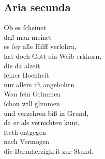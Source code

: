 \documentclass{ees}
\newenvironment{lyrics}[1]{%
  \subsection{#1}\nopagebreak%
  \begin{lyricslist}%
  \let\voice\item%
}{%
  \end{lyricslist}%
}
\begin{document}
\begin{lyrics}{Aria secunda}
  \voice[Barmh.]
  Ob es ſcheinet\\
  daß man meinet\\
  es ſey alle Hilff verlohrn,\\
  hat doch Gott ein Weib erkhorn,\\
  die da alzeit\\
  ſeiner Hochheit\\
  nur allein iſt angebohrn.\\[1ex]
  Wan ſein Grimmen\\
  ſchon will glimmen\\
  und verzehren biß in Grund,\\
  da er als vernichten kunt,\\
  ſteth entgegen\\
  nach Vermögen\\
  die Barmherzigkeit zur Stund.
\end{lyrics}
\end{document}
